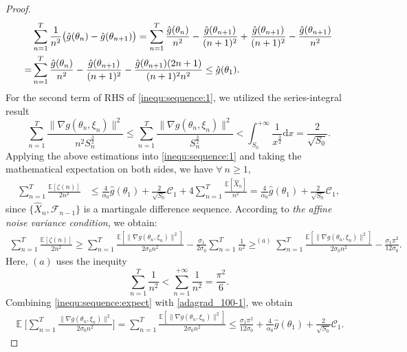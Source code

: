 \documentclass[standalone]{article}
\newcommand{\E}{\mathbb{E}}
\DeclareMathOperator{\Expect}{\mathbb{E}}
\begin{document}
\begin{proof}
\begin{align}
& \sum_{n=1}^{T}\frac{1}{n^{2}}\big(\hat{g}(\theta_{n})-\hat{g}(\theta_{n+1})\big) =  \sum_{n=1}^{T} \frac{\hat{g}(\theta_{n})}{n^2}-\frac{\hat{g}(\theta_{n+1})}{(n+1)^2} + \frac{\hat{g}(\theta_{n+1})}{(n+1)^{2}} - \frac{\hat{g}(\theta_{n+1})}{n^{2}} \notag \\
=  &\sum_{n=1}^{T} \frac{\hat{g}(\theta_{n})}{n^2}-\frac{\hat{g}(\theta_{n+1})}{(n+1)^2} - \frac{\hat{g}(\theta_{n+1})(2n+1)}{(n+1)^{2}n^2}  \leq  \hat{g}(\theta_1).
\end{align}
For the second term of RHS of \cref{inequ:sequence:1}, we utilized the series-integral result
\[\sum_{n=1}^{T}\frac{\|\nabla g(\theta_{n},\xi_{n})\|^{2}}{n^2 S_{n}^{\frac{3}{2}}} \leq \sum_{n=1}^{T}\frac{\|\nabla g(\theta_{n},\xi_{n})\|^{2}}{S_{n}^{\frac{3}{2}}}<\int_{S_{0}}^{+\infty}\frac{1}{x^{\frac{3}{2}}}\text{d}x=\frac{2}{\sqrt{S_{0}}}.\]
Applying the above estimations into \cref{inequ:sequence:1} and taking the mathematical expectation on both sides, we have $\forall\ n\ge 1,$
\begin{align}\label{inequ:sequence:expect}
\sum_{n=1}^{T}\frac{\E\left[\zeta(n)\right]}{2n^2} &\le \frac{4}{\alpha_0} \hat{g}(\theta_1) + \frac{2}{\sqrt{S_0}}\mathcal{C}_1   + 4\sum_{n=1}^{T}\frac{\E[\hat{X}_{n}]}{n^{2}} = \frac{4}{\alpha_0} \hat{g}(\theta_1) + \frac{2}{\sqrt{S_0}}\mathcal{C}_1,
\end{align}
since $\lbrace \hat{X}_{n}, \mathscr{F}_{n-1}\rbrace$ is a martingale difference sequence. According to \emph{the affine noise variance condition}, we obtain:
\begin{align}\label{adagrad_100-1}
\sum_{n=1}^{T}\frac{\E\left[\zeta(n)\right]}{2n^2}\ge \sum_{n=1}^{T}\frac{\E\left[\|\nabla g(\theta_{n},\xi_{n})\|^{2}\right]}{2\sigma_{0}n^2}-\frac{\sigma_{1}}{2\sigma_{0}}\sum_{n=1}^{T}\frac{1}{n^{2}}\mathop{\ge}^{(a)} \sum_{n=1}^{T}\frac{\E\left[\|\nabla g(\theta_{n},\xi_{n})\|^{2}\right]}{2\sigma_{0}n^2}-\frac{\sigma_{1}\pi^{2}}{12\sigma_{0}}.
\end{align}
Here, $(a)$ uses the inequity \[\sum_{n=1}^{T}\frac{1}{n^{2}}<\sum_{n=1}^{+\infty}\frac{1}{n^{2}}=\frac{\pi^{2}}{6}.\] 
Combining \cref{inequ:sequence:expect} with \cref{adagrad_100-1}, we obtain
\begin{align*}
\Expect\bigg[\sum_{n=1}^{T}\frac{\|\nabla g(\theta_{n},\xi_{n})\|^{2}}{2\sigma_{0}n^{2}}\bigg]=\sum_{n=1}^{T}\frac{\E\left[\|\nabla g(\theta_{n},\xi_{n})\|^{2}\right]}{2\sigma_{0}n^2}\le \frac{\sigma_{1}\pi^{2}}{12\sigma_{0}}+\frac{4}{\alpha_0} \hat{g}(\theta_1) + \frac{2}{\sqrt{S_0}}\mathcal{C}_1.

\end{align*}
\end{proof}
\end{document}
